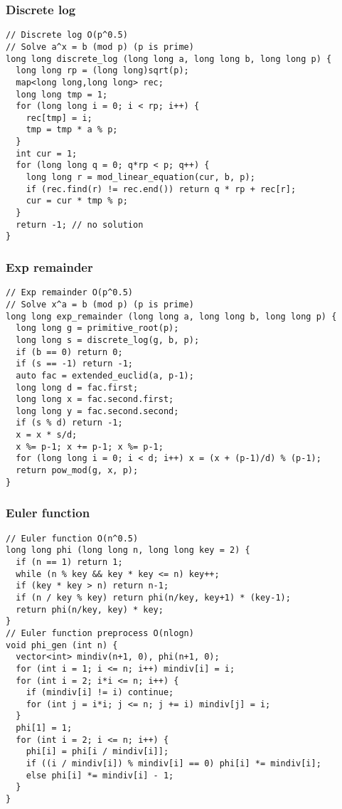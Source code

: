 \documentclass[10pt,landscape]{article}
\begin{document}
\begin{multicols}{2}
\subsubsection{Discrete log}
\begin{lstlisting}
// Discrete log O(p^0.5)
// Solve a^x = b (mod p) (p is prime)
long long discrete_log (long long a, long long b, long long p) {
  long long rp = (long long)sqrt(p);
  map<long long,long long> rec;
  long long tmp = 1;
  for (long long i = 0; i < rp; i++) {
    rec[tmp] = i;
    tmp = tmp * a % p;
  }
  int cur = 1;
  for (long long q = 0; q*rp < p; q++) {
    long long r = mod_linear_equation(cur, b, p);
    if (rec.find(r) != rec.end()) return q * rp + rec[r];
    cur = cur * tmp % p;
  }
  return -1; // no solution
}
\end{lstlisting}
\subsubsection{Exp remainder}
\begin{lstlisting}
// Exp remainder O(p^0.5)
// Solve x^a = b (mod p) (p is prime)
long long exp_remainder (long long a, long long b, long long p) {
  long long g = primitive_root(p);
  long long s = discrete_log(g, b, p);
  if (b == 0) return 0;
  if (s == -1) return -1;
  auto fac = extended_euclid(a, p-1);
  long long d = fac.first;
  long long x = fac.second.first;
  long long y = fac.second.second;
  if (s % d) return -1;
  x = x * s/d;
  x %= p-1; x += p-1; x %= p-1;
  for (long long i = 0; i < d; i++) x = (x + (p-1)/d) % (p-1);
  return pow_mod(g, x, p);
}
\end{lstlisting}
\subsubsection{Euler function}
\begin{lstlisting}
// Euler function O(n^0.5)
long long phi (long long n, long long key = 2) {
  if (n == 1) return 1;
  while (n % key && key * key <= n) key++;
  if (key * key > n) return n-1;
  if (n / key % key) return phi(n/key, key+1) * (key-1);
  return phi(n/key, key) * key;
}
// Euler function preprocess O(nlogn)
void phi_gen (int n) {
  vector<int> mindiv(n+1, 0), phi(n+1, 0);
  for (int i = 1; i <= n; i++) mindiv[i] = i;
  for (int i = 2; i*i <= n; i++) {
    if (mindiv[i] != i) continue;
    for (int j = i*i; j <= n; j += i) mindiv[j] = i;
  }
  phi[1] = 1;
  for (int i = 2; i <= n; i++) {
    phi[i] = phi[i / mindiv[i]];
    if ((i / mindiv[i]) % mindiv[i] == 0) phi[i] *= mindiv[i];
    else phi[i] *= mindiv[i] - 1;
  }
}
\end{lstlisting}

\end{multicols}
\end{document}
